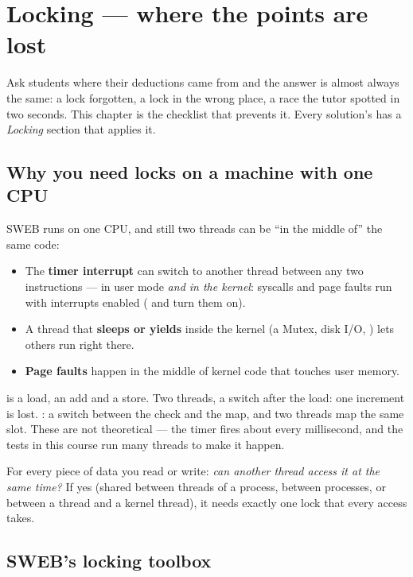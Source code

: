 \chapter{Locking --- where the points are lost}
\label{ch:locking}

Ask students where their deductions came from and the answer is almost always the same:
a lock forgotten, a lock in the wrong place, a race the tutor spotted in two seconds. This
chapter is the checklist that prevents it. Every solution's  has a
\emph{Locking} section that applies it.

\section{Why you need locks on a machine with one CPU}

SWEB runs on one CPU, and still two threads can be ``in the middle of'' the same code:

\begin{itemize}
\item The \textbf{timer interrupt} can switch to another thread between any two instructions
  --- in user mode \emph{and in the kernel}: syscalls and page faults run with interrupts
  enabled ( and  turn them on).
\item A thread that \textbf{sleeps or yields} inside the kernel (a Mutex, disk I/O,
  ) lets others run right there.
\item \textbf{Page faults} happen in the middle of kernel code that touches user memory.
\end{itemize}

 is a load, an add and a store. Two threads, a switch after the load: one
increment is lost. : a switch between the check and the map,
and two threads map the same slot. These are not theoretical --- the timer fires about every
millisecond, and the tests in this course run many threads to make it happen.

\begin{infobox}[title=\textbf{The core question}]
For every piece of data you read or write: \emph{can another thread access it at the same
time?} If yes (shared between threads of a process, between processes, or between a
thread and a kernel thread), it needs exactly one lock that every access takes.
\end{infobox}

\section{SWEB's locking toolbox}

